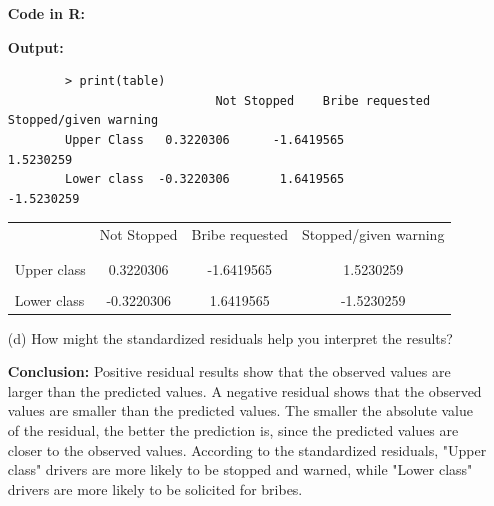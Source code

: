 \documentclass[12pt,letterpaper]{article}
\begin{document}
\begin{enumerate}
	\noindent \textbf{Code in R:}
	  
	\vspace{.25cm}
	
	\noindent \textbf{Output: }
	\begin{verbatim}
		> print(table)
					         Not Stopped    Bribe requested    Stopped/given warning
		Upper Class   0.3220306      -1.6419565             1.5230259
		Lower class  -0.3220306       1.6419565            -1.5230259
	\end{verbatim}  
	\vspace{.25cm}
	
	
	\begin{table}[h]
		\centering
		\begin{tabular}{l | c c c }
			& Not Stopped & Bribe requested & Stopped/given warning \\
			\\[-1.8ex] 
			\hline \\[-1.8ex]
			Upper class  &0.3220306  &-1.6419565  &1.5230259  \\
			\\
			Lower class &-0.3220306  &1.6419565   &-1.5230259   \\
			
		\end{tabular}
	\end{table}
	
	
	\vspace{7cm}
	\item [(d)] How might the standardized residuals help you interpret the results?  
	
	\noindent \textbf{Conclusion:} Positive residual results show that the observed values are larger than the predicted values. A negative residual shows that the observed values are smaller than the predicted values. The smaller the absolute value of the residual, the better the prediction is, since the predicted values are closer to the observed values. According to the standardized residuals, "Upper class" drivers are more likely to be stopped and warned, while "Lower class" drivers are more likely to be solicited for bribes.
	
\end{enumerate}
\newpage
\end{document}
